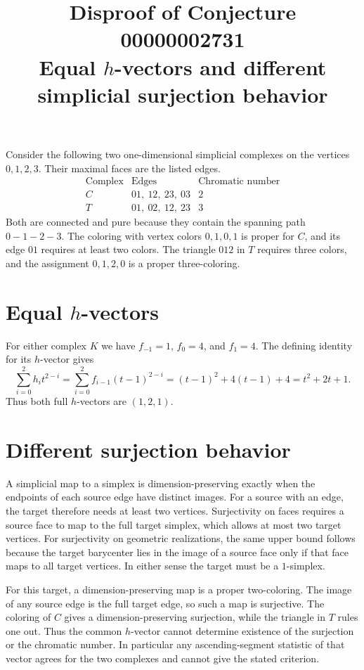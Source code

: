 \documentclass[11pt]{article}
\title{Disproof of Conjecture 00000002731\\
\large Equal \(h\)-vectors and different simplicial surjection behavior}
\author{}
\date{}
\begin{document}
\maketitle

Consider the following two one-dimensional simplicial complexes on the
vertices \(0,1,2,3\). Their maximal faces are the listed edges.
\[
\begin{array}{c|l|c}
\text{Complex} & \text{Edges} & \text{Chromatic number}\\ \hline
C & 01,\ 12,\ 23,\ 03 & 2\\
T & 01,\ 02,\ 12,\ 23 & 3
\end{array}
\]
Both are connected and pure because they contain the spanning path
\(0\!-\!1\!-\!2\!-\!3\). The coloring with vertex colors \(0,1,0,1\)
is proper for \(C\), and its edge \(01\) requires at least two colors.
The triangle \(012\) in \(T\) requires three colors, and the assignment
\(0,1,2,0\) is a proper three-coloring.

\section*{Equal \(h\)-vectors}

For either complex \(K\) we have \(f_{-1}=1\), \(f_0=4\), and \(f_1=4\).
The defining identity for its \(h\)-vector gives
\[
  \sum_{i=0}^{2} h_i t^{2-i}
   = \sum_{i=0}^{2} f_{i-1}(t-1)^{2-i}
   = (t-1)^2+4(t-1)+4 = t^2+2t+1 .
\]
Thus both full \(h\)-vectors are \((1,2,1)\).

\section*{Different surjection behavior}

A simplicial map to a simplex is dimension-preserving exactly when
the endpoints of each source edge have distinct images. For a source
with an edge, the target therefore needs at least two vertices.
Surjectivity on faces requires a source face to map to the full target
simplex, which allows at most two target vertices. For surjectivity on
geometric realizations, the same upper bound follows because the target
barycenter lies in the image of a source face only if that face maps to
all target vertices. In either sense the target must be a \(1\)-simplex.

For this target, a dimension-preserving map is a proper two-coloring.
The image of any source edge is the full target edge, so such a map
is surjective. The coloring of \(C\) gives a dimension-preserving
surjection, while the triangle in \(T\) rules one out. Thus the common
\(h\)-vector cannot determine existence of the surjection or the
chromatic number. In particular any ascending-segment statistic of
that vector agrees for the two complexes and cannot give the stated
criterion.
\end{document}
